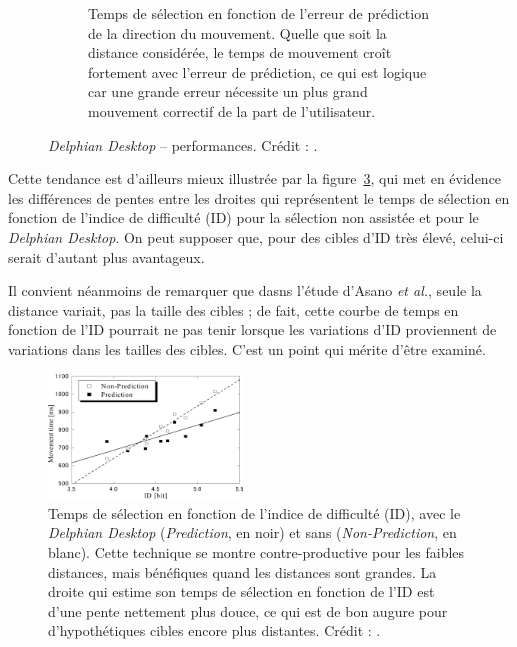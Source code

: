 \begin{figure}[!htb]
\begin{subfigure}[t]{0.49\textwidth}
			\caption{Temps de sélection en fonction de l'erreur de prédiction de la direction du mouvement. Quelle que soit la distance considérée, le temps de mouvement croît fortement avec l'erreur de prédiction, ce qui est logique car une grande erreur nécessite un plus grand mouvement correctif de la part de l'utilisateur.}
			\label{fig:delphianTimesErrors}
		\end{subfigure}
		\caption[\emph{Delphian Desktop} -- performances]{\emph{Delphian Desktop} -- performances. Crédit : \cite{asano2005predictive}.}
		\label{fig:plop}
	\end{figure}

	Cette tendance est d'ailleurs mieux illustrée par la figure~\ref{fig:delphianTimesID}, qui met en évidence les différences de pentes entre les droites qui représentent le temps de sélection en fonction de l'indice de difficulté (ID) pour la sélection non assistée et pour le \emph{Delphian Desktop}. On peut supposer que, pour des cibles d'ID très élevé, celui-ci serait d'autant plus avantageux.
	
	Il convient néanmoins de remarquer que dasns l'étude d'Asano \emph{et al.}, seule la distance variait, pas la taille des cibles ; de fait, cette courbe de temps en fonction de l'ID pourrait ne pas tenir lorsque les variations d'ID proviennent de variations dans les tailles des cibles. C'est un point qui mérite d'être examiné.

	\begin{figure} %
		\centering
		\includegraphics[width=0.46\textwidth]{figures/ch2/delphianTimesID}
		\caption[\emph{Delphian Desktop} -- temps de sélection en fonction de l'ID]{Temps de sélection en fonction de l'indice de difficulté (ID), avec le \emph{Delphian Desktop} (\emph{Prediction}, en noir) et sans (\emph{Non-Prediction}, en blanc). Cette technique se montre contre-productive pour les faibles distances, mais bénéfiques quand les distances sont grandes. La droite qui estime son temps de sélection en fonction de l'ID est d'une pente nettement plus douce, ce qui est de bon augure pour d'hypothétiques cibles encore plus distantes. Crédit : \cite{asano2005predictive}.}
		\label{fig:delphianTimesID}
	\end{figure}
	
